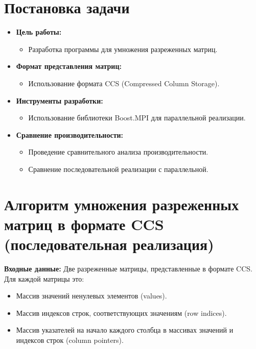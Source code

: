 \documentclass[12pt]{article}
\begin{document}
\section*{Постановка задачи}
\begin{itemize}
    \item \textbf{Цель работы:}
        \begin{itemize}
            \item Разработка программы для умножения разреженных матриц.
        \end{itemize}
    \item \textbf{Формат представления матриц:}
        \begin{itemize}
            \item Использование формата CCS (Compressed Column Storage).
        \end{itemize}
    \item \textbf{Инструменты разработки:}
        \begin{itemize}
             \item Использование библиотеки Boost.MPI для параллельной реализации.
        \end{itemize}
    \item \textbf{Сравнение производительности:}
         \begin{itemize}
            \item Проведение сравнительного анализа производительности.
            \item Сравнение последовательной реализации с параллельной.
         \end{itemize}
\end{itemize}
\newpage

\section*{Алгоритм умножения разреженных матриц в формате CCS (последовательная реализация)}
\textbf{Входные данные:} Две разреженные матрицы, представленные в формате CCS. Для каждой матрицы это:
\begin{itemize}
    \item Массив значений ненулевых элементов (values).
    \item Массив индексов строк, соответствующих значениям (row indices).
    \item Массив указателей на начало каждого столбца в массивах значений и индексов строк (column pointers).
\end{itemize}
\end{document}
